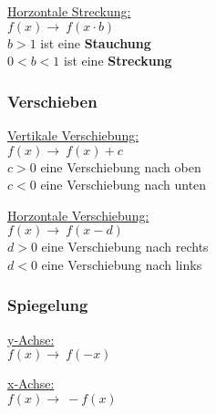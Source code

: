\underline{Horzontale Streckung:} \\
$f(x) \rightarrow\ f(x \cdot b)$ \\
$b > 1$ ist eine \textbf{Stauchung} \\
$0 < b < 1$ ist eine \textbf{Streckung} 

\subsubsection{Verschieben}
\underline{Vertikale Verschiebung:} \\
$f(x) \rightarrow\ f(x) + c$ \\
$c > 0$ eine Verschiebung nach oben \\
$c < 0$ eine Verschiebung nach unten

\underline{Horzontale Verschiebung:} \\
$f(x) \rightarrow\ f(x - d)$ \\
$d > 0$ eine Verschiebung nach rechts \\
$d < 0$ eine Verschiebung nach links

\subsubsection{Spiegelung}
\underline{y-Achse:} \\
$f(x) \rightarrow\ f(-x)$

\underline{x-Achse:} \\
$f(x) \rightarrow\ -f(x)$
